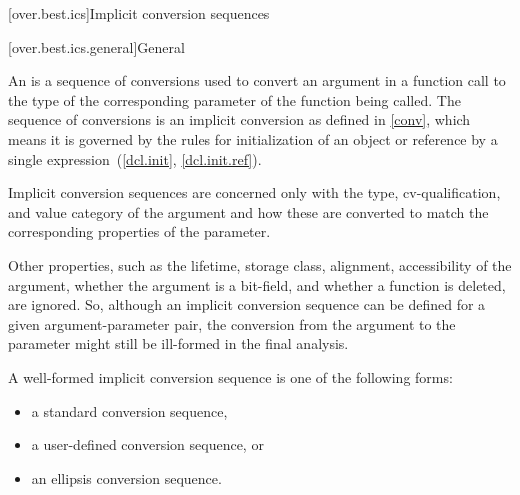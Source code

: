 [over.best.ics]{Implicit conversion sequences}%

[over.best.ics.general]{General}%

\pnum
An 
is a sequence of conversions used
to convert an argument in a function call to the type of the
corresponding parameter of the function being called.
The
sequence of conversions is an implicit conversion as defined in
\ref{conv}, which means it is governed by the rules for
initialization of an object or reference by a single
expression~(\ref{dcl.init}, \ref{dcl.init.ref}).

\pnum
Implicit conversion sequences are concerned only with the type,
cv-qualification, and value category of the argument and how these
are converted to match the corresponding properties of the
parameter.
\begin{note}
Other properties, such as the lifetime, storage class,
alignment, accessibility of the argument, whether the argument is a bit-field,
and whether a function is deleted, are ignored.
So, although an implicit
conversion sequence can be defined for a given argument-parameter
pair, the conversion from the argument to the parameter might still
be ill-formed in the final analysis.
\end{note}

\pnum
A
well-formed implicit conversion
sequence is one of the following forms:
\begin{itemize}
\item
a standard conversion sequence,
\item
a user-defined conversion sequence, or
\item
an ellipsis conversion sequence.
\end{itemize}

